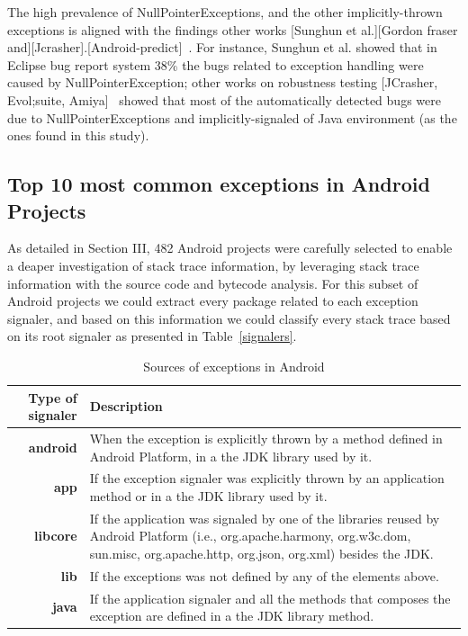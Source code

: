 \documentclass[conference]{IEEEtran}
\begin{document}
The high prevalence of NullPointerExceptions, and the other implicitly-thrown exceptions  is aligned with the findings other works [Sunghun et al.][Gordon fraser and][Jcrasher].[Android-predict]~. For instance, Sunghun et al. showed that in Eclipse bug report system 38\% the bugs related to exception handling were caused by NullPointerException; other works on robustness testing [JCrasher, Evol;suite, Amiya]~ showed that most of the automatically detected bugs were due to NullPointerExceptions and implicitly-signaled of Java environment (as the ones found in this study).


\subsection{Top 10 most common exceptions in Android Projects}

As detailed in Section III, 482 Android projects were carefully selected to enable a deaper investigation of stack trace information, by leveraging stack trace information with the source code and bytecode analysis. For this subset of Android projects we could extract every package related to each exception signaler, and based on this information we could classify every stack trace based on its root signaler as presented in Table~\ref{signalers}.

\begin{table}
  \centering
  \begin{tabular}{rp{22em}}
    \hline
    \bfseries{Type of signaler} & \bfseries{Description} \\
    \hline
    \bfseries{android} & When the exception is explicitly thrown by a method defined in Android Platform, in a the JDK library used by it.\\
    \bfseries{app} &	If the exception signaler was explicitly thrown by an application method or in a the JDK library used by it.\\
    \bfseries{libcore} &	If the application was signaled by one of the libraries reused by Android Platform (i.e., org.apache.harmony, org.w3c.dom, sun.misc, org.apache.http, org.json, org.xml) besides the JDK. \\
    \bfseries{lib} &	If the exceptions was not defined by any of the elements above.\\
    \bfseries{java} &	If the application signaler and all the methods that composes the exception are defined in a the JDK library method.\\
    \hline
  \end{tabular}
  \caption{Sources of exceptions in Android}
  \label{tab:signalers}
\end{table}
\end{document}
